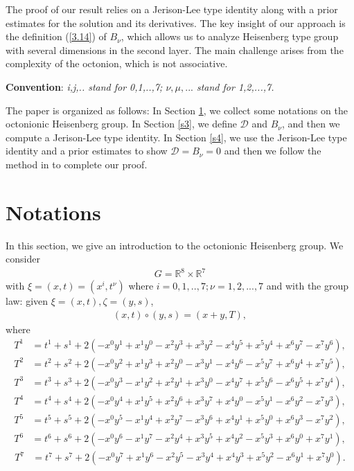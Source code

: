 \documentclass[10pt,a4paper]{amsart}
\numberwithin{equation}{section}
\begin{document}
 The proof of our result relies on a Jerison-Lee type identity along with a  prior estimates for the solution and its derivatives. The key insight of our approach is the definition (\ref{3.14}) of $B_\nu$, which allows us to analyze Heisenberg type group with several dimensions in the second layer. The main challenge arises from the complexity of the octonion, which is not associative. 
 
\textbf{Convention}: \textit{i,j,.. stand for 0,1,..,7; $\nu,\mu,...$ stand for 1,2,...,7.}


 
 The paper is organized as follows: In Section \ref{s2}, we collect some notations on the octonionic Heisenberg group. In Section \ref{s3}, we define $\mathcal{D}$ and $B_\nu$, and then we compute a Jerison-Lee type identity. In Section \ref{s4}, we use the Jerison-Lee type identity and a prior estimates to show $\mathcal{D}=B_\nu= 0$ and then we follow the method in \cite{IMV2014} to complete our proof.

 
\section{Notations}\label{s2}
In this section, we give an introduction to the octonionic Heisenberg group. We consider
\begin{align*}
    G=\mathbb{R}^{8}\times \mathbb{R}^7
\end{align*}
with $\xi=(x,t)=(x^i, t^\nu)$ where $ i=0,1,..,7; \nu=1,2,...,7$ and with the group law: given $\xi=(x,t),\zeta=(y,s)$,
\begin{align*}
    (x,t)\circ(y,s)=(x+y,T),
\end{align*}
where 
\small{
\begin{align*}
    T^1&=t^1+s^1+2(-x^0 y^1+x^1 y^0-x^2 y^3+x^3 y^2-x^4y^5+x^5 y^4+x^6 y^7-x^7 y^6),
\end{align*}
\begin{align*}
    T^2&=t^2+s^2+2(-x^0 y^2+x^1 y^3+x^2 y^0-x^3y^1-x^4y^6-x^5 y^7+x^6 y^4+x^7 y^5),
\end{align*}
\begin{align*}
    T^3&=t^3+s^3+2(-x^0 y^3-x^1 y^2+x^2 y^1+x^3 y^0-x^4y^7+x^5 y^6-x^6 y^5+x^7 y^4),
\end{align*}
\begin{align*}
    T^4&=t^4+s^4+2(-x^0 y^4+x^1 y^5+x^2 y^6+x^3 y^7+x^4 y^0-x^5 y^1-x^6 y^2-x^7 y^3),
\end{align*}
\begin{align*}
    T^5&=t^5+s^5+2(-x^0 y^5-x^1 y^4+x^2 y^7-x^3y^6+x^4y^1+x^5 y^0+x^6 y^3-x^7 y^2),
\end{align*}
\begin{align*}
    T^6&=t^6+s^6+2(-x^0 y^6-x^1 y^7-x^2 y^4+x^3 y^5+x^4y^2-x^5 y^3+x^6 y^0+x^7 y^1),
\end{align*}
\begin{align*}
    T^7&=t^7+s^7+2(-x^0 y^7+x^1 y^6-x^2 y^5-x^3y^4+x^4y^3+x^5 y^2-x^6 y^1+x^7 y^0).
\end{align*}}
\end{document}
